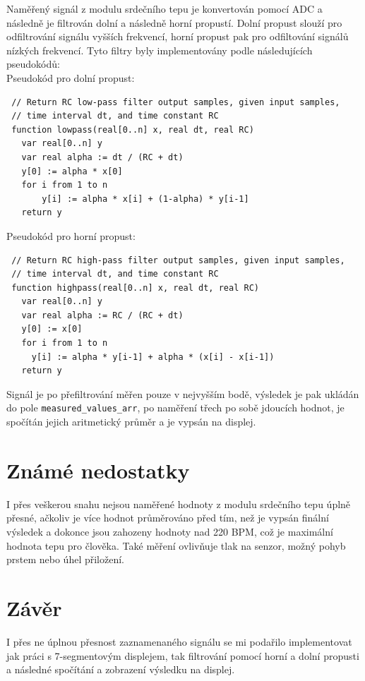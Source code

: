 \documentclass[a4paper, 11pt]{article}
\begin{document}
Naměřený signál z modulu srdečního tepu je konvertován pomocí ADC a následně je filtrován dolní a následně horní propustí. Dolní propust slouží pro odfiltrování signálu vyšších frekvencí, horní propust pak pro odfiltování signálů nízkých frekvencí. Tyto filtry byly implementovány podle následujících pseudokódů:\\
Pseudokód pro dolní propust:\cite{Lowpass:web}
\begin{lstlisting}
 // Return RC low-pass filter output samples, given input samples,
 // time interval dt, and time constant RC
 function lowpass(real[0..n] x, real dt, real RC)
   var real[0..n] y
   var real alpha := dt / (RC + dt)
   y[0] := alpha * x[0]
   for i from 1 to n
       y[i] := alpha * x[i] + (1-alpha) * y[i-1]
   return y
\end{lstlisting}
Pseudokód pro horní propust:\cite{Highpass:web}
\begin{lstlisting}
 // Return RC high-pass filter output samples, given input samples,
 // time interval dt, and time constant RC
 function highpass(real[0..n] x, real dt, real RC)
   var real[0..n] y
   var real alpha := RC / (RC + dt)
   y[0] := x[0]
   for i from 1 to n
     y[i] := alpha * y[i-1] + alpha * (x[i] - x[i-1])
   return y
\end{lstlisting}

Signál je po přefiltrování měřen pouze v nejvyšším bodě, výsledek je pak ukládán do pole \verb|measured_values_arr|, po naměření třech po sobě jdoucích hodnot, je spočítán jejich aritmetický průměr a je vypsán na displej. 
\section{Známé nedostatky}
I přes veškerou snahu nejsou naměřené hodnoty z modulu srdečního tepu úplně přesné, ačkoliv je více hodnot průměrováno před tím, než je vypsán finální výsledek a dokonce jsou zahozeny hodnoty nad 220 BPM, což je maximální hodnota tepu pro člověka. Také měření ovlivňuje tlak na senzor, možný pohyb prstem nebo úhel přiložení.
\section{Závěr}
I přes ne úplnou přesnost zaznamenaného signálu se mi podařilo implementovat jak práci s 7-segmentovým displejem, tak filtrování pomocí horní a dolní propusti a následné spočítání a zobrazení výsledku na displej. 
\newpage

\end{document}
